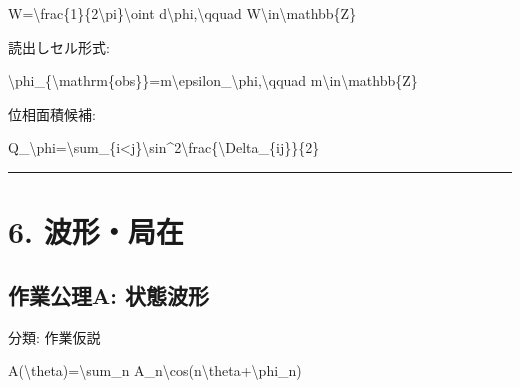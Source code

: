 \documentclass[
  a4paper,
]{ltjsarticle}
\newenvironment{Shaded}{}{}
\newcommand{\NormalTok}[1]{#1}
\begin{document}
\begin{Shaded}
\begin{Highlighting}[]
\NormalTok{W=\textbackslash{}frac\{1\}\{2\textbackslash{}pi\}\textbackslash{}oint d\textbackslash{}phi,\textbackslash{}qquad W\textbackslash{}in\textbackslash{}mathbb\{Z\}}
\end{Highlighting}
\end{Shaded}

読出しセル形式:

\begin{Shaded}
\begin{Highlighting}[]
\NormalTok{\textbackslash{}phi\_\{\textbackslash{}mathrm\{obs\}\}=m\textbackslash{}epsilon\_\textbackslash{}phi,\textbackslash{}qquad m\textbackslash{}in\textbackslash{}mathbb\{Z\}}
\end{Highlighting}
\end{Shaded}

位相面積候補:

\begin{Shaded}
\begin{Highlighting}[]
\NormalTok{Q\_\textbackslash{}phi=\textbackslash{}sum\_\{i\textless{}j\}\textbackslash{}sin\^{}2\textbackslash{}frac\{\textbackslash{}Delta\_\{ij\}\}\{2\}}
\end{Highlighting}
\end{Shaded}

\begin{center}\rule{0.5\linewidth}{0.5pt}\end{center}

\section{6. 波形・局在}\label{ux6ce2ux5f62ux5c40ux5728}

\subsection{作業公理A:
状態波形}\label{ux4f5cux696dux516cux7406a-ux72b6ux614bux6ce2ux5f62}

分類: 作業仮説

\begin{Shaded}
\begin{Highlighting}[]
\NormalTok{A(\textbackslash{}theta)=\textbackslash{}sum\_n A\_n\textbackslash{}cos(n\textbackslash{}theta+\textbackslash{}phi\_n)}
\end{Highlighting}
\end{Shaded}
\end{document}
